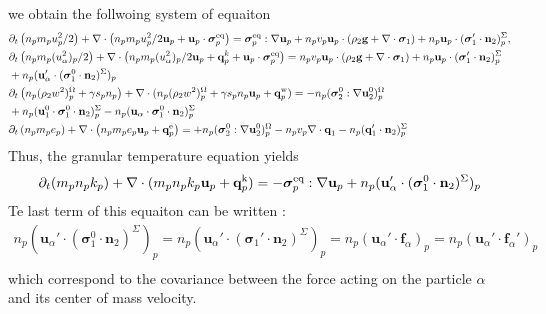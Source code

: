 we obtain the follwoing system of equaiton 
\begin{align*}
    &\partial_t \left(n_p m_p u_p^2/ 2\right)
    + \mathbf{\nabla}\cdot \left(n_p
    m_p u_p^2/ 2 \textbf{u}_p 
    + \textbf{u}_p \cdot \bm{\sigma}_p^\text{eq}
    \right)
    = 
     \bm{\sigma}_p^\text{eq}  :\mathbf{\nabla} \textbf{u}_p
    +  n_p v_p \textbf{u}_p \cdot 
    (\rho_2 \textbf{g} + \mathbf{\nabla}\cdot \bm{\sigma}_1)
    + n_p \textbf{u}_p \cdot (\bm{\sigma}_1' \cdot \textbf{n}_2)^\Sigma_p,\\
    &\partial_t \left(n_p m_p (u_\alpha^2)_p/ 2\right)
    + \mathbf{\nabla}\cdot \left(n_p
    m_p (u_\alpha^2)_p/ 2 \textbf{u}_p 
    + \textbf{q}^k_p
    + \textbf{u}_p \cdot \bm{\sigma}_p^\text{eq}
    \right)
    = 
    n_p v_p \textbf{u}_p \cdot
    (\rho_2 \textbf{g} + \mathbf{\nabla}\cdot \bm{\sigma}_1)
    + n_p\textbf{u}_p\cdot (\bm{\sigma}_1' \cdot \textbf{n}_2)^\Sigma_p\\
    &+n_p(\textbf{u}_\alpha'\cdot(\bm{\sigma}_1^0 \cdot \textbf{n}_2)^\Sigma)_p
    \\
    &\partial_t \left(n_p (\rho_2 w^2 )_p^\Omega+\gamma s_p n_p\right)
    + \mathbf{\nabla}\cdot 
    (n_p (\rho_2 w^2 )_p^\Omega+\gamma s_p n_p
    \textbf{u}_p 
    +  \textbf{q}_p^\text{w}
    )
    = 
    - n_p (\bm{\sigma}_2^0 : \mathbf{\nabla}\textbf{u}_2^0)^\Omega_p\\
    &+ n_p (\textbf{u}_1^0 \cdot \bm{\sigma}_1^0 \cdot  \textbf{n}_2)^\Sigma_p
    - n_p (\textbf{u}_\alpha \cdot \bm{\sigma}_1^0 \cdot  \textbf{n}_2)^\Sigma_p\\
    &\partial_t \left(n_p m_p e_p\right)
    + \mathbf{\nabla}\cdot \left(n_p
    m_p e_p \textbf{u}_p 
    +  \textbf{q}_p^\text{e}
    \right)
    = 
    + n_p (\bm{\sigma}_2^0 : \mathbf{\nabla}\textbf{u}_2^0)^\Omega_p
    - n_p v_p \mathbf{\nabla}\cdot \textbf{q}_1
    - n_p (\textbf{q}_1'\cdot \textbf{n}_2)^\Sigma_p\\
\end{align*}
Thus, the granular temperature equation yields 
\begin{multline*}
    \partial_t(m_p n_pk_p)
    + \mathbf{\nabla}\cdot(m_pn_p k_p \textbf{u}_p 
    + \textbf{q}_p^\text{k})
    = 
     - \bm{\sigma}_p^\text{eq}  :\mathbf{\nabla} \textbf{u}_p
     + n_p (\textbf{u}_\alpha' \cdot (\bm{\sigma}_1^0 \cdot  \textbf{n}_2)^\Sigma)_p
    \\
\end{multline*}
Te last term of this equaiton can be written : 
\begin{multline*}
    n_p (\textbf{u}_\alpha' \cdot (\bm{\sigma}_1^0 \cdot  \textbf{n}_2)^\Sigma)_p
    = n_p (\textbf{u}_\alpha' \cdot (\bm{\sigma}_1' \cdot  \textbf{n}_2)^\Sigma)_p
    = n_p (\textbf{u}_\alpha' \cdot \textbf{f}_\alpha)_p
    = n_p (\textbf{u}_\alpha' \cdot \textbf{f}_\alpha')_p
    \\
\end{multline*}
which correspond to the covariance between the force acting on the particle $\alpha$ and its center of mass velocity. 


